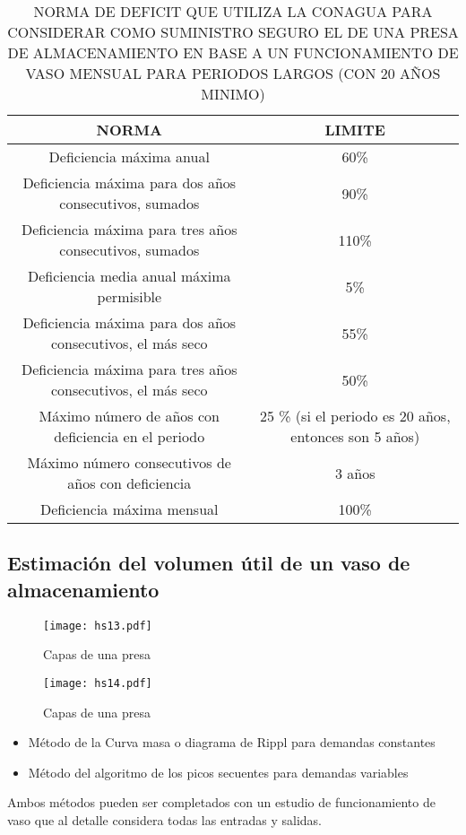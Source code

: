 \begin{table}[h!]
    \centering
    \begin{tabular}{@{}cc@{}}
    \toprule
    NORMA                                                         & LIMITE  \\ \midrule
    Deficiencia máxima anual                                      & 60\%  \\
    Deficiencia máxima para dos años consecutivos, sumados        & 90\%  \\
    Deficiencia máxima para tres años consecutivos, sumados       & 110\%  \\
    Deficiencia media anual máxima permisible                     & 5\% \\
    Deficiencia máxima para dos años consecutivos, el más seco    & 55\%   \\
    Deficiencia máxima para tres años consecutivos, el más   seco & 50\%   \\
    Máximo número de años con deficiencia en el periodo & 25 \% (si el periodo es 20 años, entonces son 5 años) \\
    Máximo número consecutivos de años con deficiencia            & 3 años  \\
    Deficiencia máxima mensual                                    & 100\%  \\ \bottomrule
    \end{tabular}
    \caption{NORMA DE DEFICIT QUE UTILIZA LA CONAGUA PARA CONSIDERAR COMO SUMINISTRO SEGURO EL DE UNA PRESA DE ALMACENAMIENTO EN BASE A UN FUNCIONAMIENTO DE VASO MENSUAL PARA PERIODOS LARGOS (CON 20 AÑOS MINIMO)}
    \label{tabhs12}
\end{table}
\subsection{Estimación del volumen útil de un vaso de almacenamiento}
\begin{figure}[h!]
\centering
  \texttt{[image: hs13.pdf]}
  \caption{Capas de una presa}
  \label{hs13}
\end{figure}
\begin{figure}[h!]
    \centering
      \texttt{[image: hs14.pdf]}
      \caption{Capas de una presa}
      \label{hs14}
\end{figure}
\begin{itemize}
    \item Método de la Curva masa o diagrama de Rippl para demandas constantes
    \item Método del algoritmo de los picos secuentes para demandas variables
\end{itemize}
Ambos métodos pueden ser completados con un estudio de funcionamiento de vaso que al detalle considera todas las entradas y salidas.

